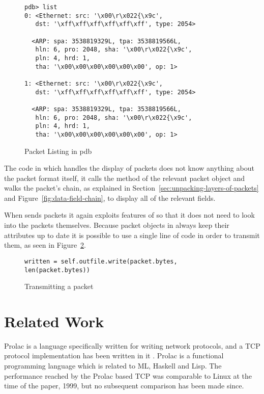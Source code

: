 \documentclass{sig-alternate-10pt}
\begin{document}
\begin{figure}
  \centering
\begin{verbatim}
pdb> list
0: <Ethernet: src: '\x00\r\x022{\x9c', 
   dst: '\xff\xff\xff\xff\xff\xff', type: 2054>

  <ARP: spa: 3538819329L, tpa: 3538819566L, 
   hln: 6, pro: 2048, sha: '\x00\r\x022{\x9c', 
   pln: 4, hrd: 1, 
   tha: '\x00\x00\x00\x00\x00\x00', op: 1>

1: <Ethernet: src: '\x00\r\x022{\x9c', 
   dst: '\xff\xff\xff\xff\xff\xff', type: 2054>

  <ARP: spa: 3538819329L, tpa: 3538819566L, 
   hln: 6, pro: 2048, sha: '\x00\r\x022{\x9c', 
   pln: 4, hrd: 1, 
   tha: '\x00\x00\x00\x00\x00\x00', op: 1>
\end{verbatim}
  \caption{Packet Listing in pdb}
  \label{fig:packet-listing}
\end{figure}

The code in  which handles the display of packets does
not know anything about the packet format itself, it calls the
 method of the relevant packet object and walks the
packet's  chain, as explained in
Section~\ref{sec:unpacking-layers-of-packets} and
Figure~\ref{fig:data-field-chain}, to display all of the relevant
fields.

When  sends packets it again exploits features of
 so that it does not need to look into the packets
themselves.  Because packet objects in  always keep their
 attributes up to date it is possible to use a single
line of code in order to transmit them, as seen in
Figure~\ref{fig:transmitting-a-packet}.

\begin{figure}
  \centering
\begin{verbatim}
written = self.outfile.write(packet.bytes, len(packet.bytes))
\end{verbatim}
  \caption{Transmitting a packet}
  \label{fig:transmitting-a-packet}
\end{figure}

\section{Related Work}
\label{sec:related-work}

Prolac is a language specifically written for writing network
protocols, and a TCP protocol implementation has been written in it
\cite{kohler:sigcomm99}.  Prolac is a functional programming language
which is related to ML, Haskell and Lisp.  The performance reached by
the Prolac based TCP was comparable to Linux at the time of the paper,
1999, but no subsequent comparison has been made since.
\end{document}
